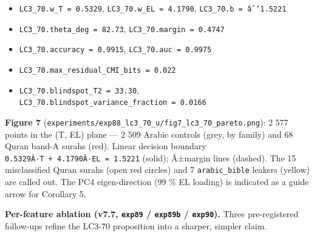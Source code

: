 \documentclass[
]{article}
\providecommand{\tightlist}{%
  \setlength{\itemsep}{0pt}\setlength{\parskip}{0pt}}
\begin{document}
\begin{itemize}
\tightlist
\item
  \texttt{LC3\_70.w\_T\ =\ 0.5329}, \texttt{LC3\_70.w\_EL\ =\ 4.1790},
  \texttt{LC3\_70.b\ =\ âˆ’1.5221}
\item
  \texttt{LC3\_70.theta\_deg\ =\ 82.73},
  \texttt{LC3\_70.margin\ =\ 0.4747}
\item
  \texttt{LC3\_70.accuracy\ =\ 0.9915}, \texttt{LC3\_70.auc\ =\ 0.9975}
\item
  \texttt{LC3\_70.max\_residual\_CMI\_bits\ =\ 0.022}
\item
  \texttt{LC3\_70.blindspot\_T2\ =\ 33.30},
  \texttt{LC3\_70.blindspot\_variance\_fraction\ =\ 0.0166}
\end{itemize}

\textbf{Figure 7}
(\texttt{experiments/exp88\_lc3\_70\_u/fig7\_lc3\_70\_pareto.png}): 2
577 points in the (T, EL) plane --- 2 509 Arabic controls (grey, by
family) and 68 Quran band-A surahs (red). Linear decision boundary
\texttt{0.5329Â·T\ +\ 4.1790Â·EL\ =\ 1.5221} (solid); Â±margin lines
(dashed). The 15 misclassified Quran surahs (open red circles) and 7
\texttt{arabic\_bible} leakers (yellow) are called out. The PC4
eigen-direction (99 \% EL loading) is indicated as a guide arrow for
Corollary 5.

\textbf{Per-feature ablation (v7.7, \texttt{exp89} / \texttt{exp89b} /
\texttt{exp90}).} Three pre-registered follow-ups refine the LC3-70
proposition into a sharper, simpler claim.
\end{document}
